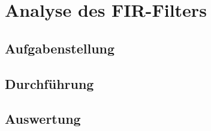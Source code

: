 \chapter{Analyse des FIR-Filters}
\section{Aufgabenstellung}
\section{Durchf\"uhrung}
\section{Auswertung}